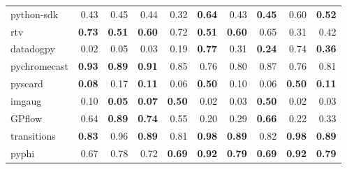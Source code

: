 \documentclass[submit,noauthor,ses,dvipdfmx]{ipsj}
\begin{document}
\begin{table}[t]
{\begin{tabular}{l|rrr|rrr|rrr}
    python-sdk & \multicolumn{1}{r|}{0.43} & \multicolumn{1}{r|}{0.45} & 0.44 & \multicolumn{1}{r|}{0.32} & \multicolumn{1}{r|}{\textbf{0.64}} & 0.43 & \multicolumn{1}{r|}{\textbf{0.45}} & \multicolumn{1}{r|}{0.60} & \textbf{0.52} \\
    rtv & \multicolumn{1}{r|}{\textbf{0.73}} & \multicolumn{1}{r|}{\textbf{0.51}} & \textbf{0.60} & \multicolumn{1}{r|}{0.72} & \multicolumn{1}{r|}{\textbf{0.51}} & \textbf{0.60} & \multicolumn{1}{r|}{0.65} & \multicolumn{1}{r|}{0.31} & 0.42 \\
    datadogpy & \multicolumn{1}{r|}{0.02} & \multicolumn{1}{r|}{0.05} & 0.03 & \multicolumn{1}{r|}{0.19} & \multicolumn{1}{r|}{\textbf{0.77}} & 0.31 & \multicolumn{1}{r|}{\textbf{0.24}} & \multicolumn{1}{r|}{0.74} & \textbf{0.36} \\
    pychromecast & \multicolumn{1}{r|}{\textbf{0.93}} & \multicolumn{1}{r|}{\textbf{0.89}} & \textbf{0.91} & \multicolumn{1}{r|}{0.85} & \multicolumn{1}{r|}{0.76} & 0.80 & \multicolumn{1}{r|}{0.87} & \multicolumn{1}{r|}{0.76} & 0.81 \\
    pyscard & \multicolumn{1}{r|}{\textbf{0.08}} & \multicolumn{1}{r|}{0.17} & \textbf{0.11} & \multicolumn{1}{r|}{0.06} & \multicolumn{1}{r|}{\textbf{0.50}} & 0.10 & \multicolumn{1}{r|}{0.06} & \multicolumn{1}{r|}{\textbf{0.50}} & \textbf{0.11} \\
    imgaug & \multicolumn{1}{r|}{0.10} & \multicolumn{1}{r|}{\textbf{0.05}} & \textbf{0.07} & \multicolumn{1}{r|}{\textbf{0.50}} & \multicolumn{1}{r|}{0.02} & 0.03 & \multicolumn{1}{r|}{\textbf{0.50}} & \multicolumn{1}{r|}{0.02} & 0.03 \\
    GPflow & \multicolumn{1}{r|}{0.64} & \multicolumn{1}{r|}{\textbf{0.89}} & \textbf{0.74} & \multicolumn{1}{r|}{0.55} & \multicolumn{1}{r|}{0.20} & 0.29 & \multicolumn{1}{r|}{\textbf{0.66}} & \multicolumn{1}{r|}{0.22} & 0.33 \\
    transitions & \multicolumn{1}{r|}{\textbf{0.83}} & \multicolumn{1}{r|}{0.96} & \textbf{0.89} & \multicolumn{1}{r|}{0.81} & \multicolumn{1}{r|}{\textbf{0.98}} & \textbf{0.89} & \multicolumn{1}{r|}{0.82} & \multicolumn{1}{r|}{\textbf{0.98}} & \textbf{0.89} \\
    pyphi & \multicolumn{1}{r|}{0.67} & \multicolumn{1}{r|}{0.78} & 0.72 & \multicolumn{1}{r|}{\textbf{0.69}} & \multicolumn{1}{r|}{\textbf{0.92}} & \textbf{0.79} & \multicolumn{1}{r|}{\textbf{0.69}} & \multicolumn{1}{r|}{\textbf{0.92}} & \textbf{0.79} \\ \hline
    \end{tabular}
}
\end{table}
\end{document}
